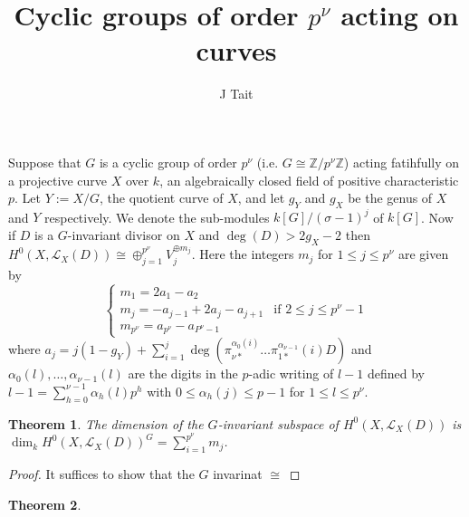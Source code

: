 \documentclass[11pt]{article} %
\title{Cyclic groups of order $p^{\nu}$ acting on curves}
\author{J Tait}
\newtheorem{thm}{Theorem}
\begin{document}
\maketitle

Suppose that $G$ is a cyclic group of order $p^{\nu}$ (i.e. $G\cong \mathbb{Z}/p^{\nu}\mathbb{Z}$) acting fatihfully on a projective
curve $X$ over $k$, an algebraically closed field of positive characteristic $p$. Let $Y:=X/G$, the quotient curve of $X$, and let $g_Y$ and $g_X$ be the genus of $X$ and $Y$ respectively. We denote the sub-modules 
$k[G]/(\sigma-1)^j$ of $k[G]$. Now if $D$ is a $G$-invariant divisor on $X$ and $\deg(D)>2g_X-2$ then $H^0(X,\mathscr{L}_X(D))\cong \oplus_{j=1}^{p^{\nu}}
V_j^{\oplus m_j}$. Here the integers $m_j$ for $1\leq j \leq p^{\nu}$ are given by
   \begin{equation*}
      \begin{cases}
	m_1=2a_1-a_2 &\\
	m_j=-a_{j-1}+2a_j-a_{j+1} & \mbox{if } 2\leq j \leq p^{\nu}-1 \\
	m_{p^{\nu}}=a_{p^{\nu}}-a_{P^{\nu}-1} &
      \end{cases}
   \end{equation*}
where $a_j=j(1-g_Y)+\sum_{i=1}^j\deg(\pi_{\nu *}^{\alpha_0(i)}\ldots\pi_{1*}^{\alpha_{\nu-1}}(i)D)$ and $\alpha_0(l),\ldots ,\alpha_{\nu -1}(l)$ are the digits 
in the $p$-adic writing of $l-1$ defined by $l-1=\sum_{h=0}^{\nu -1}\alpha_h(l)p^h$ with $0 \leq \alpha_h(j)\leq p-1$ for $1\leq l \leq p^{\nu}$.

\begin{thm}
  The dimension of the $G$-invariant subspace of $H^0(X,\mathscr{L}_X(D))$ is $\dim_kH^0(X,\mathscr{L}_X(D))^G=\sum_{i=1}^{p^{\nu}}m_j$.
\end{thm}
\begin{proof}
  It suffices to show that the $G$ invarinat $\cong$

\end{proof}

\begin{thm}
  
\end{thm}




\end{document}

